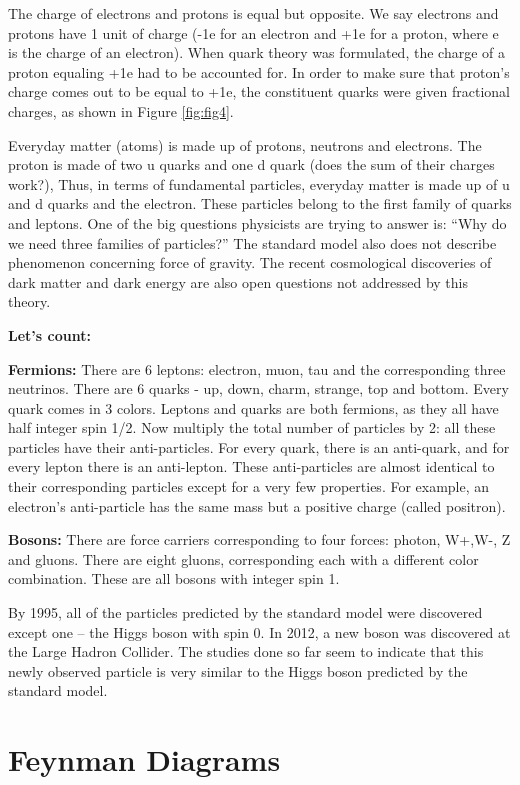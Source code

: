 The charge of electrons and protons is equal but opposite. We say electrons and protons have 1 unit of charge (-1e for an electron and +1e for a proton, where e is the charge of an electron). When quark theory was formulated, the charge of a proton equaling +1e had to be accounted for. In order to make sure that proton’s charge comes out to be equal to +1e, the constituent quarks were given fractional charges, as shown in Figure \ref{fig:fig4}.


Everyday matter (atoms) is made up of protons, neutrons and electrons. The proton is made of two u quarks and one d quark (does the sum of their charges work?), Thus, in terms of fundamental particles,  everyday matter is made up of u and d quarks and the electron.  These particles belong to the first family of quarks and leptons. One of the big questions physicists are trying to answer is: 
``Why do we need three families of particles?” The standard model also does not describe phenomenon concerning force of gravity. The recent cosmological discoveries of dark matter and dark energy are also open questions not addressed by this theory. 

{\bf Let’s count:} 

{\bf Fermions:} There are 6 leptons: electron, muon, tau and the corresponding three neutrinos.
There are 6 quarks - up, down, charm, strange, top and bottom. Every quark comes in 3 colors.
Leptons and quarks are both fermions, as they all have half integer spin 1/2.
Now multiply the total number of particles by 2: all these particles have their anti-particles. For every quark, there is an anti-quark, and for every lepton there is an anti-lepton. These anti-particles are almost identical to their corresponding particles except for a very few properties.  For example, an electron's anti-particle has the same mass but a positive charge (called positron).

{\bf Bosons:} There are force carriers corresponding to four forces: photon, W+,W-,  Z and gluons.  There are eight gluons, corresponding each with a different color combination.  These are all bosons with integer spin 1.

By 1995, all of the particles predicted by the standard model were discovered except one – the Higgs boson with spin 0. In 2012, a new boson was discovered at the Large Hadron Collider.  The studies done so far seem to indicate that this newly observed particle is very similar to the Higgs boson predicted by the standard model. 


\section{Feynman Diagrams}

